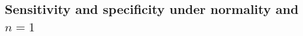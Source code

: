 \documentclass[12pt]{article}
\begin{document}



\subsection{Sensitivity and specificity under normality and $n = 1$}
\label{subsec:theory_sensitivity}
\end{document}
